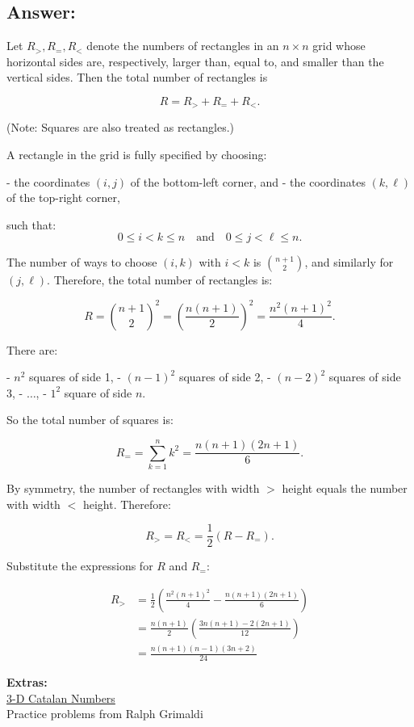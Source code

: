 \documentclass{article}
\begin{document}
\subsection*{Answer:}
Let $R_{>}, R_{=}, R_{<}$ denote the numbers of rectangles in an $n \times n$ grid whose horizontal sides are, respectively, larger than, equal to, and smaller than the vertical sides. Then the total number of rectangles is

\[
R = R_{>} + R_{=} + R_{<}.
\]

(Note: Squares are also treated as rectangles.)

A rectangle in the grid is fully specified by choosing:

- the coordinates $(i, j)$ of the bottom-left corner, and  
- the coordinates $(k, \ell)$ of the top-right corner,

such that:
\[
0 \leq i < k \leq n \quad \text{and} \quad 0 \leq j < \ell \leq n.
\]

The number of ways to choose $(i, k)$ with $i < k$ is $\binom{n+1}{2}$, and similarly for $(j, \ell)$. Therefore, the total number of rectangles is:

\[
R = \binom{n+1}{2}^2 = \left( \frac{n(n+1)}{2} \right)^2 = \frac{n^2(n+1)^2}{4}.
\]


There are:

- $n^2$ squares of side 1,  
- $(n-1)^2$ squares of side 2,  
- $(n-2)^2$ squares of side 3,  
- $\dots$,  
- $1^2$ square of side $n$.

So the total number of squares is:

\[
R_{=} = \sum_{k=1}^{n} k^2 = \frac{n(n+1)(2n+1)}{6}.
\]


By symmetry, the number of rectangles with width $>$ height equals the number with width $<$ height. Therefore:

\[
R_{>} = R_{<} = \frac{1}{2}(R - R_{=}).
\]

Substitute the expressions for $R$ and $R_{=}$:

\begin{align*}
R_{>} &= \frac{1}{2} \left( \frac{n^2(n+1)^2}{4} - \frac{n(n+1)(2n+1)}{6} \right) \\
&= \frac{n(n+1)}{2} \left( \frac{3n(n+1) - 2(2n+1)}{12} \right) \\
&= \frac{n(n+1)(n-1)(3n+2)}{24}
\end{align*}

\vspace{0.5cm}
\noindent
\textbf{Extras:}\\
\href{https://www.mat.univie.ac.at/~slc/wpapers/FPSAC2017/39%20Borie.pdf}{3-D Catalan Numbers}\\
Practice problems from Ralph Grimaldi
\end{document}
